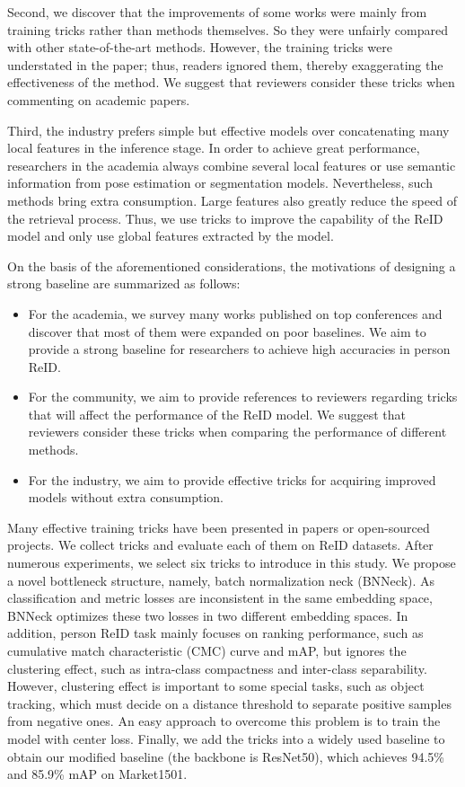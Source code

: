 \documentclass[journal]{IEEEtran}
\begin{document}
Second, we discover that the improvements of some works were mainly from training tricks rather than methods themselves.
So they were unfairly compared with other state-of-the-art methods.
However, the training tricks were understated in the paper; thus, readers ignored them, thereby exaggerating the effectiveness of the method. We suggest that reviewers consider these tricks when commenting on academic papers.

Third, the industry prefers simple but effective models over concatenating many local features in the inference stage.
In order to achieve great performance, researchers in the academia always combine several local features or use semantic information from pose estimation or segmentation models. Nevertheless, such methods bring extra consumption. Large features also greatly reduce the speed of the retrieval process. Thus, we use tricks to improve the capability of the ReID model and only use global features extracted by the model.

On the basis of the aforementioned considerations, the motivations of designing a strong baseline are summarized as follows:
\begin{itemize}
  \item For the academia, we survey many works published on top conferences and discover that most of them were expanded on poor baselines. We aim to provide a strong baseline for researchers to achieve high accuracies in person ReID.
  \item For the community, we aim to provide references to reviewers regarding tricks that will affect the performance of the ReID model. We suggest that reviewers consider these tricks when comparing the performance of different methods.
  \item For the industry, we aim to provide effective tricks for acquiring improved models without extra consumption.
\end{itemize}

Many effective training tricks have been presented in papers or open-sourced projects. We collect tricks and evaluate each of them on ReID datasets. After numerous experiments, we select six tricks to introduce in this study. We propose a novel bottleneck structure, namely, batch normalization neck (BNNeck). As classification and metric losses are inconsistent in the same embedding space, BNNeck optimizes these two losses in two different embedding spaces. In addition, person ReID task mainly focuses on ranking performance, such as cumulative match characteristic (CMC) curve and mAP, but ignores the clustering effect, such as intra-class compactness and inter-class separability. However, clustering effect is important to some special tasks, such as object tracking, which must decide on a distance threshold to separate positive samples from negative ones. An easy approach to overcome this problem is to train the model with center loss. Finally, we add the tricks into a widely used baseline to obtain our modified baseline (the backbone is ResNet50), which achieves 94.5\% and 85.9\% mAP on Market1501.
\end{document}
